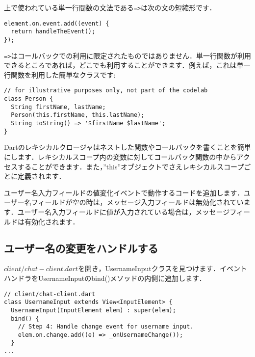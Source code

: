 上で使われている単一行間数の文法である\verb|=>|は次の文の短縮形です．

\begin{verbatim}
element.on.event.add((event) {
  return handleTheEvent();
});
\end{verbatim}

\verb|=>|はコールバックでの利用に限定されたものではありません．単一行関数が利用できるところであれば，どこでも利用することができます．例えば，これは単一行関数を利用した簡単なクラスです:

\begin{verbatim}
// for illustrative purposes only, not part of the codelab
class Person {
  String firstName, lastName;
  Person(this.firstName, this.lastName);
  String toString() => '$firstName $lastName';
}
\end{verbatim}

Dartのレキシカルクロージャはネストした関数やコールバックを書くことを簡単にします．レキシカルスコープ内の変数に対してコールバック関数の中からアクセスすることができます．また，''this''オブジェクトでさえレキシカルスコープごとに定義されます．


ユーザー名入力フィールドの値変化イベントで動作するコードを追加します．ユーザー名フィールドが空の時は，メッセージ入力フィールドは無効化されています．ユーザー名入力フィールドに値が入力されている場合は，メッセージフィールドは有効化されます．

\subsection{ユーザー名の変更をハンドルする}

$ client/chat-client.dart $を開き，UsernameInputクラスを見つけます．イベントハンドラをUsernameInputのbind()メソッドの内側に追加します．

\begin{verbatim}
// client/chat-client.dart
class UsernameInput extends View<InputElement> {
  UsernameInput(InputElement elem) : super(elem);
  bind() {
    // Step 4: Handle change event for username input.
    elem.on.change.add((e) => _onUsernameChange());
  }
...
\end{verbatim}

